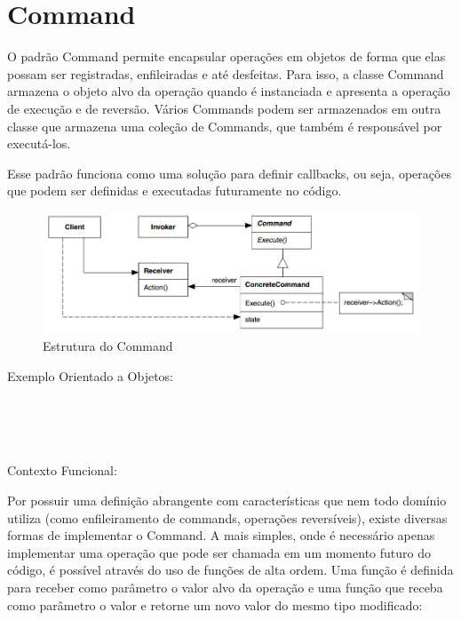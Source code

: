 \section{Command}

O padrão Command permite encapsular operações em objetos 
de forma que elas possam ser registradas, enfileiradas 
e até desfeitas. Para isso, a classe Command armazena o 
objeto alvo da operação quando é instanciada e apresenta 
a operação de execução e de reversão. Vários Commands 
podem ser armazenados em outra classe que armazena uma 
coleção de Commands, que também é responsável por 
executá-los.

Esse padrão funciona como uma solução para definir 
callbacks, ou seja, operações que podem ser definidas 
e executadas futuramente no código.

\begin{figure}[htb]
	\caption{\label{command_struct}Estrutura do Command}
	\begin{center}
	    \includegraphics[scale=0.4]{5_padroes-contexto-funcional/5.3_comportamentais/5.3.02_command/diagram.png}
	\end{center}
\end{figure}

Exemplo Orientado a Objetos:

\begin{lstlisting}[caption={Command Orientação a Objetos},label=oocommand]


    
\end{lstlisting}

Contexto Funcional:

Por possuir uma definição abrangente com características 
que nem todo domínio utiliza (como enfileiramento de 
commands, operações reversíveis), existe diversas formas 
de implementar o Command. A mais simples, onde é necessário 
apenas implementar uma operação que pode ser chamada em 
um momento futuro do código, é possível através do uso 
de funções de alta ordem. Uma função é definida para 
receber como parâmetro o valor alvo da operação e uma 
função que receba como parâmetro o valor e retorne um 
novo valor do mesmo tipo modificado:

